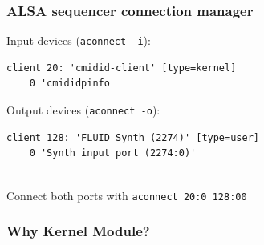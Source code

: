 \begin{frame}[fragile]
	\frametitle{ALSA sequencer connection manager}
Input devices (\texttt{aconnect -i}):
  	\begin{lstlisting}
client 20: 'cmidid-client' [type=kernel] 
    0 'cmididpinfo    
	\end{lstlisting}
Output devices (\texttt{aconnect -o}):
  	\begin{lstlisting}
client 128: 'FLUID Synth (2274)' [type=user]
    0 'Synth input port (2274:0)'
\end{lstlisting}
$ $
\\
Connect both ports with \texttt{aconnect 20:0 128:00}



\end{frame}

\begin{frame}
	\frametitle{Why Kernel Module?}
\end{frame} 
